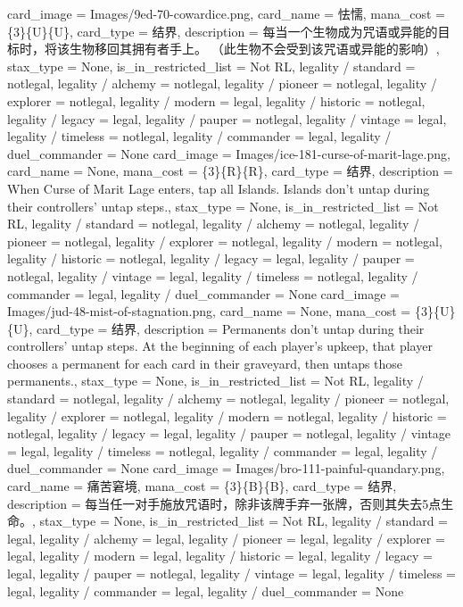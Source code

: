 \documentclass[lang = cn, color = black, 10pt]{AllThatStax}
\begin{document}
\card
{
	card_image = Images/9ed-70-cowardice.png,
	card_name = 怯懦,
	mana_cost = \{3\}\{U\}\{U\},
	card_type = 结界,
	description = 每当一个生物成为咒语或异能的目标时，将该生物移回其拥有者手上。 （此生物不会受到该咒语或异能的影响）,
	stax_type = None,
	is_in_restricted_list = Not RL,
	legality / standard = notlegal,
	legality / alchemy = notlegal,
	legality / pioneer = notlegal,
	legality / explorer = notlegal,
	legality / modern = legal,
	legality / historic = notlegal,
	legality / legacy = legal,
	legality / pauper = notlegal,
	legality / vintage = legal,
	legality / timeless = notlegal,
	legality / commander = legal,
	legality / duel_commander = None
}
\card
{
	card_image = Images/ice-181-curse-of-marit-lage.png,
	card_name = None,
	mana_cost = \{3\}\{R\}\{R\},
	card_type = 结界,
	description = When Curse of Marit Lage enters, tap all Islands.
	Islands don't untap during their controllers' untap steps.,
	stax_type = None,
	is_in_restricted_list = Not RL,
	legality / standard = notlegal,
	legality / alchemy = notlegal,
	legality / pioneer = notlegal,
	legality / explorer = notlegal,
	legality / modern = notlegal,
	legality / historic = notlegal,
	legality / legacy = legal,
	legality / pauper = notlegal,
	legality / vintage = legal,
	legality / timeless = notlegal,
	legality / commander = legal,
	legality / duel_commander = None
}
\card
{
	card_image = Images/jud-48-mist-of-stagnation.png,
	card_name = None,
	mana_cost = \{3\}\{U\}\{U\},
	card_type = 结界,
	description = Permanents don't untap during their controllers' untap steps.
	At the beginning of each player's upkeep, that player chooses a permanent for each card in their graveyard, then untaps those permanents.,
	stax_type = None,
	is_in_restricted_list = Not RL,
	legality / standard = notlegal,
	legality / alchemy = notlegal,
	legality / pioneer = notlegal,
	legality / explorer = notlegal,
	legality / modern = notlegal,
	legality / historic = notlegal,
	legality / legacy = legal,
	legality / pauper = notlegal,
	legality / vintage = legal,
	legality / timeless = notlegal,
	legality / commander = legal,
	legality / duel_commander = None
}
\card
{
	card_image = Images/bro-111-painful-quandary.png,
	card_name = 痛苦窘境,
	mana_cost = \{3\}\{B\}\{B\},
	card_type = 结界,
	description = 每当任一对手施放咒语时，除非该牌手弃一张牌，否则其失去5点生命。,
	stax_type = None,
	is_in_restricted_list = Not RL,
	legality / standard = legal,
	legality / alchemy = legal,
	legality / pioneer = legal,
	legality / explorer = legal,
	legality / modern = legal,
	legality / historic = legal,
	legality / legacy = legal,
	legality / pauper = notlegal,
	legality / vintage = legal,
	legality / timeless = legal,
	legality / commander = legal,
	legality / duel_commander = None
}
\end{document}

